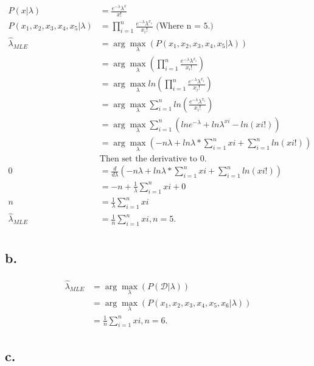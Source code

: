 \documentclass{article}
\begin{document}
\begin{subequations}
\begin{align*}
P(x|\lambda) & = \frac{e^{-\lambda}\lambda^{x}}{x!} \\
P(x_1, x_2, x_3, x_4, x_5|\lambda) 
& = \prod^{n}_{i=1}\frac{e^{-\lambda}\lambda^{x_i}}{x_i!} \text{ (Where n = 5.)} \\
\hat{\lambda}_{MLE} & = \arg\max_{\lambda} (P(x_1, x_2, x_3, x_4, x_5|\lambda) ) \\
& = \arg\max_{\lambda} (\prod^{n}_{i=1}\frac{e^{-\lambda}\lambda^{x_i}}{x_i!}) \\
& = \arg\max_{\lambda} ln(\prod^{n}_{i=1}\frac{e^{-\lambda}\lambda^{x_i}}{x_i!}) \\
& = \arg\max_{\lambda} \sum_{i=1}^{n} ln(\frac{e^{-\lambda}\lambda^{x_i}}{x_i!} ) \\
& = \arg\max_{\lambda} \sum_{i=1}^{n} (lne^{-\lambda}+ln\lambda^{xi}-ln(xi!)) \\
& = \arg\max_{\lambda}  (-n\lambda + ln\lambda*\sum_{i=1}^{n}xi + \sum_{i=1}^{n}ln(xi!)) \\
& \text{Then set the derivative to 0.} \\
0 & = \frac{d}{d\lambda} (-n\lambda + ln\lambda*\sum_{i=1}^{n}xi + \sum_{i=1}^{n}ln(xi!)) \\
& = -n + \frac{1}{\lambda} \sum_{i=1}^{n} xi + 0 \\
n & = \frac{1}{\lambda} \sum_{i=1}^{n} xi \\
\hat{\lambda}_{MLE} & = \frac{1}{n} \sum_{i=1}^{n} xi , n = 5.\\
\end{align*} 
\end{subequations}


\subsection*{b.}
\begin{subequations}
\begin{align*}
	\hat{\lambda}_{MLE} & = \arg\max_{\lambda} (P(\mathcal{D}|\lambda))                   \\
	                    & =  \arg\max_{\lambda} (P(x_1, x_2, x_3, x_4, x_5, x_6|\lambda)) \\
	                    & = \frac{1}{n} \sum_{i=1}^{n} xi , n = 6.
\end{align*}
\end{subequations}


\subsection*{c.}
\end{document}

